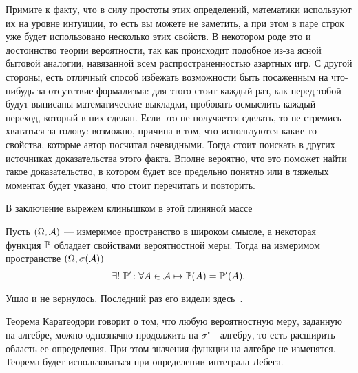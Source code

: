 \documentclass[../TV&MS.tex]{subfiles}
\begin{document}
Примите к факту, что в силу простоты этих определений, математики используют их на уровне
интуиции, то есть вы можете не заметить, а при этом в паре строк уже будет использовано 
несколько этих свойств. В некотором роде это и достоинство теории вероятности, так как
происходит подобное из-за ясной бытовой аналогии, навязанной всем распространенностью
азартных игр. С другой стороны, есть отличный способ избежать возможности быть
посаженным на что-нибудь за отсутствие формализма: для этого стоит каждый раз, как перед тобой
будут выписаны математические выкладки, пробовать осмыслить каждый переход, который
в них сделан. Если это не получается сделать, то не стремись хвататься за голову: возможно,
причина в том, что используются какие-то свойства, которые автор посчитал очевидными.
Тогда стоит поискать в других источниках доказательства этого факта. Вполне вероятно,
что это поможет найти такое доказательство, в котором будет все предельно понятно или 
в тяжелых моментах будет указано, что стоит перечитать и повторить.

В заключение вырежем клинышком в этой глиняной массе  

\begin{Th}[Каратеодори]
Пусть $(\Omega, \mathcal{A})$ --- измеримое пространство в широком смысле, 
а некоторая функция $\mathbb{P}$ обладает свойствами вероятностной меры. 
Тогда на измеримом пространстве $(\Omega, \sigma(\mathcal{A}))$
$$
	\exists !\  \mathbb{P}' \colon \forall A \in \mathcal{A} \mapsto \mathbb{P}(A) = \mathbb{P}'(A).
$$
\end{Th}
\begin{Proof}
	Ушло и не вернулось. Последний раз его видели здесь~\cite{Gusev}.
\end{Proof}

\begin{Why}
	Теорема Каратеодори говорит о том, что любую вероятностную меру, 
	заданную на алгебре, можно однозначно продолжить на $\sigma$"--~алгебру, то есть расширить 
	область ее определения. При этом значения функции на алгебре не изменятся. Теорема будет 
	использоваться при определении интеграла Лебега.
\end{Why}
\newpage
\end{document}
